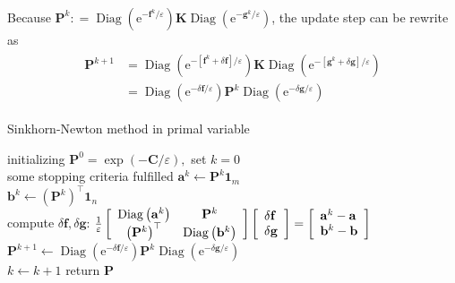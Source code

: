 \documentclass{article}
\begin{document}
\begin{large}
\begin{align}
\end{align}
Because $ \mathbf {P} ^ { k } : = \operatorname { Diag } \left( \mathrm { e } ^ { -  \mathbf {f} ^ { k } / \varepsilon } \right) \mathbf { K} \operatorname { Diag } \left( \mathrm { e } ^ { -  \mathbf {g} ^ { k } / \varepsilon } \right)$, the update step can be rewrite as
\begin{align}
\begin{aligned}  \mathbf {P} ^ { k + 1 } & = \operatorname { Diag } \left( \mathrm { e } ^ { - \left[  \mathbf {f} ^ { k } + \delta  \mathbf {f} \right] / \varepsilon } \right)  \mathbf {K} \operatorname { Diag } \left( \mathrm { e } ^ { - \left[  \mathbf {g} ^ { k } + \delta  \mathbf {g} \right] / \varepsilon } \right) \\ & = \operatorname { Diag } \left( \mathrm { e } ^ { - \delta  \mathbf {f} / \varepsilon } \right)  \mathbf {P} ^ { k } \operatorname { Diag } \left( \mathrm { e } ^ { - \delta  \mathbf {g} / \varepsilon } \right) \end{aligned}
\end{align}


\begin{algorithm}[H]
  \SetAlgoNoLine
  \caption{Sinkhorn-Newton method in primal variable} 
   initializing $\mathbf{P} ^ { 0 } = \exp ( - \mathbf{C} / \varepsilon ) ,$ set $k = 0$\\
  \Repeat
  { some stopping criteria fulfilled }{
 $\mathbf{a} ^ { k } \gets \mathbf{P} ^ { k } \mathbf{1}_ { m }$\\  
 $\mathbf{b} ^ { k } \gets \left( \mathbf{P} ^ { k } \right) ^ { \top } \mathbf { 1 } _ { n }$\\
  compute $\delta \mathbf{f}, \delta \mathbf{g}$: 
  \quad$\frac { 1 } { \varepsilon } \left[ \begin{array} { c c } { \operatorname { Diag } \left( \mathbf{a} ^ { k } \right) } & { \mathbf{P} ^ { k } } \\ { \left( \mathbf{P} ^ { k } \right) ^ { \top } } & { \operatorname { Diag } \left( \mathbf{b} ^ { k } \right) } \end{array} \right] \left[ \begin{array} { l } { \delta \mathbf{f} } \\ { \delta \mathbf{g} } \end{array} \right] = \left[ \begin{array} { l } { \mathbf{a} ^ { k } - \mathbf{a} } \\ { \mathbf{b} ^ { k } - \mathbf{b} } \end{array} \right]$\\
$\mathbf{P} ^ { k + 1 } \gets \operatorname { Diag } \left( \mathrm { e } ^ { - \delta \mathbf{f} / \varepsilon } \right) \mathbf{P} ^ { k } \operatorname { Diag } \left( \mathrm { e } ^ { - \delta \mathbf{g} / \varepsilon } \right)$\\
   $k\gets k+1$
  }
  return $\mathbf{P}$
\end{algorithm}


\end{large}
\end{document}
